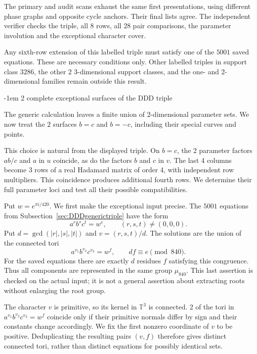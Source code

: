 \documentclass[11pt,a4paper]{article}
\makeatletter
\theoremstyle{plain}
\theoremstyle{definition}
\theoremstyle{plain}
\renewcommand\subsection{\@startsection{subsection}{2}{\z@}  {\medskipamount}  {-1em}  {\normalfont\normalsize\bfseries}}
\makeatother
\begin{document}
\medskip

The primary and audit scans exhaust the same first presentations, using different phase graphs and opposite cycle anchors. Their final lists agree. The independent verifier checks the triple, all $8$ rows, all $28$ pair comparisons, the parameter involution and the exceptional character cover.

Any sixth-row extension of this labelled triple must satisfy one of the $5001$ saved equations. These are necessary conditions only. Other labelled triples in support class $3286$, the other $2$ 3-dimensional support classes, and the one- and 2-dimensional families remain outside this result.

\subsection{2 complete exceptional surfaces of the DDD triple}\label{sec:DDDexceptionalsurfaces}

The generic calculation leaves a finite union of $2$-dimensional parameter sets. We now treat the $2$ surfaces $b=c$ and $b=-c$, including their special curves and points.

This choice is natural from the displayed triple. On $b=c$, the 2 parameter factors $ab/c$ and $a$ in $u$ coincide, as do the factors $b$ and $c$ in $v$. The last 4 columns become 3 rows of a real Hadamard matrix of order 4, with independent row multipliers. This coincidence produces additional fourth rows. We determine their full parameter loci and test all their possible compatibilities.

\medskip
Put $w=e^{\pi i/420}$. We first make the exceptional input precise. The $5001$ equations from Subsection~\ref{sec:DDDgenerictriple} have the form
$$a^r b^s c^t=w^{e},\qquad (r,s,t)\ne(0,0,0).$$
Put $d=\gcd(|r|,|s|,|t|)$ and $v=(r,s,t)/d$. The solutions are the union of the connected tori
\[
a^{v_1}b^{v_2}c^{v_3}=w^{f},\qquad
 df\equiv e\pmod{840}.
\]
For the saved equations there are exactly $d$ residues $f$ satisfying this congruence. Thus all components are represented in the same group $\mu_{840}$. This last assertion is checked on the actual input; it is not a general assertion about extracting roots without enlarging the root group.

The character $v$ is primitive, so its kernel in $\mathbb T^3$ is connected. 2 of the tori in $a^{v_1}b^{v_2}c^{v_3}=w^f$ coincide only if their primitive normals differ by sign and their constants change accordingly. We fix the first nonzero coordinate of $v$ to be positive. Deduplicating the resulting pairs $(v,f)$ therefore gives distinct connected tori, rather than distinct equations for possibly identical sets.
\end{document}
